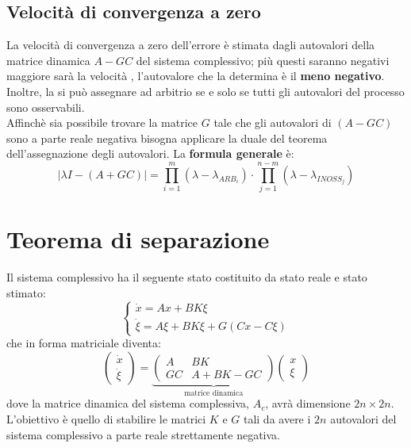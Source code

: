 \documentclass{report}
\theoremstyle{nostyle}
\begin{document}
\subsection{Velocità di convergenza a zero}
La velocità di convergenza a zero dell'errore è stimata dagli autovalori della matrice dinamica $A-GC$ del sistema complessivo; più questi saranno negativi maggiore sarà la velocità , l'autovalore che la determina è il \textbf{meno negativo}.
Inoltre, la si può assegnare ad arbitrio se e solo se tutti gli autovalori del processo sono osservabili.\smallskip\\
Affinchè sia possibile trovare la matrice $G$ tale che gli autovalori di $(A-GC)$ sono a parte reale negativa bisogna applicare la duale del teorema dell'assegnazione degli autovalori. La \textbf{formula generale} è:
\[       \left|  \lambda I -(A+GC)   \right|   = \prod_{i = 1}^{m} (\lambda - \lambda_{ARB_i}) \cdot \prod_{j = 1}^{n-m} (\lambda-\lambda_{INOSS_j})    \]






\section{Teorema di separazione}
Il sistema complessivo ha il seguente stato costituito da stato reale e stato stimato:
\[     \begin{cases}
    \dot{x} = A x + BK \xi \\
    \dot{\xi} = A \xi + BK\xi + G(Cx-C\xi) 
\end{cases}     \]
che in forma matriciale diventa:
\[       \begin{pmatrix}
    \dot{x} \\ \dot{\xi}
\end{pmatrix}     = \underbrace{\begin{pmatrix}
    A & BK \\ GC & A+BK-GC
\end{pmatrix} }_{\text{matrice dinamica}} \begin{pmatrix}
    x \\ \xi 
\end{pmatrix}         \]
dove la matrice dinamica del sistema complessiva, $A_c$, avrà dimensione $2n \times 2n $. L'obiettivo è quello di stabilire le matrici $K$ e $G$ tali da avere i $2n$ autovalori del sistema complessivo a parte reale strettamente negativa.
\end{document}
